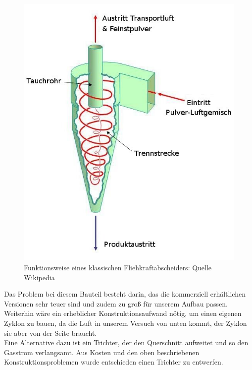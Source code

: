 \begin{figure}[h]
	\begin{center}
		\includegraphics[scale=0.5]{Umsetzung_Fliehkraftabscheider.jpg}
		\caption{Funktionsweise eines klassischen Fliehkraftabscheiders: Quelle Wikipedia}
	\end{center}
\end{figure}



Das Problem bei diesem Bauteil besteht darin, das die kommerziell erhältlichen Versionen sehr teuer sind und zudem zu groß für unserem Aufbau passen. \\
Weiterhin wäre ein erheblicher Konstruktionsaufwand nötig, um einen eigenen Zyklon zu bauen, da die Luft in unserem Versuch von unten kommt, der Zyklon sie aber von der Seite braucht. \\
Eine Alternative dazu ist ein Trichter, der den Querschnitt aufweitet und so den Gasstrom verlangsamt. Aus Kosten und den oben beschriebenen Konstruktionsproblemen wurde entschieden einen Trichter zu entwerfen.



